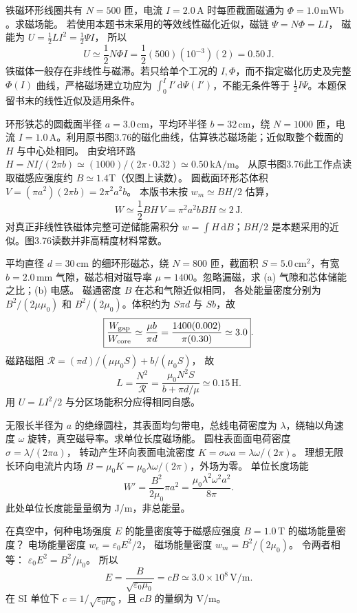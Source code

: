 铁磁环形线圈共有 $N=500$ 匝，电流 $I=2.0\,\mathrm A$ 时每匝截面磁通为 $\Phi=1.0\,\mathrm{mWb}$。求磁场能。
\exsolution
若使用本题书末采用的等效线性磁化近似，磁链 $\Psi=N\Phi=LI$，
磁能为 $U=\frac12 LI^2=\frac12\Psi I$，
所以
\[
\boxed{U\simeq\frac12N\Phi I
=\frac12(500)(10^{-3})(2)=0.50\,\mathrm J}.
\]
\excheck 铁磁体一般存在非线性与磁滞。若只给单个工况的 $I,\Phi$，而不指定磁化历史及完整 $\Phi(I)$ 曲线，严格磁场建立功应为 $\int_0^I I'\,\mathrm d\Psi(I')$，不能无条件等于 $\frac12I\Psi$。本题保留书末的线性近似及适用条件。

环形铁芯的圆截面半径 $a=3.0\,\mathrm{cm}$，平均环半径 $b=32\,\mathrm{cm}$，绕 $N=1000$ 匝，电流 $I=1.0\,\mathrm A$。利用原书图3.76的磁化曲线，估算铁芯磁场能；近似取整个截面的 $H$ 与中心处相同。
\exsolution
由安培环路
$H=NI/(2\pi b)\simeq(1000)/(2\pi\cdot0.32)
\simeq0.50\,\mathrm{kA/m}$。
从原书图3.76此工作点读取磁感应强度约 $B\simeq1.4$T（仅图上读数）。
圆截面环形芯体积
$V=(\pi a^2)(2\pi b)=2\pi^2a^2b$。
本版书末按 $w_m\simeq BH/2$ 估算，
\[
\boxed{W\simeq\frac12BH\,V
=\pi^2a^2bBH\simeq2\,\mathrm J}.
\]
\excheck 对真正非线性铁磁体完整可逆储能需积分 $w=\int H\,\mathrm dB$；$BH/2$ 是本题采用的近似。图3.76读数并非高精度材料常数。

平均直径 $d=30\,\mathrm{cm}$ 的细环形磁芯，绕 $N=800$ 匝，截面积 $S=5.0\,\mathrm{cm^2}$，有宽 $b=2.0\,\mathrm{mm}$ 气隙，磁芯相对磁导率 $\mu=1400$。忽略漏磁，求 (a) 气隙和芯体储能之比；(b) 电感。
\exsolution
磁通密度 $B$ 在芯和气隙近似相同，
各处能量密度分别为 $B^2/(2\mu\mu_0)$ 和 $B^2/(2\mu_0)$。体积约为 $S\pi d$ 与 $Sb$，故
\[
\boxed{\frac{W_{\rm gap}}{W_{\rm core}}
\simeq\frac{\mu b}{\pi d}
=\frac{1400(0.002)}{\pi(0.30)}\simeq3.0}.
\]
磁路磁阻
$\mathcal R=(\pi d)/(\mu\mu_0S)+b/(\mu_0S)$，
故
\[
\boxed{L=\frac{N^2}{\mathcal R}
=\frac{\mu_0N^2S}{b+\pi d/\mu}
\simeq0.15\,\mathrm H}.
\]
\excheck 用 $U=LI^2/2$ 与分区场能积分应得相同自感。

无限长半径为 $a$ 的绝缘圆柱，其表面均匀带电，总线电荷密度为 $\lambda$，绕轴以角速度 $\omega$ 旋转，真空磁导率。求单位长度磁场能。
\exsolution
圆柱表面面电荷密度
$\sigma=\lambda/(2\pi a)$，
转动产生环向表面电流密度
$K=\sigma\omega a=\lambda\omega/(2\pi)$。
理想无限长环向电流片内场
$B=\mu_0K=\mu_0\lambda\omega/(2\pi)$，外场为零。
单位长度场能
\[
W'=\frac{B^2}{2\mu_0}\pi a^2
=\boxed{\frac{\mu_0\lambda^2\omega^2a^2}{8\pi}}.
\]
\excheck 此处单位长度能量量纲为 J/m，非总能量。

在真空中，何种电场强度 $E$ 的能量密度等于磁感应强度 $B=1.0\,\mathrm T$ 的磁场能量密度？
\exsolution
电场能量密度 $w_e=\varepsilon_0E^2/2$，
磁场能量密度 $w_m=B^2/(2\mu_0)$。
令两者相等：
$\varepsilon_0E^2=B^2/\mu_0$。
所以
\[
\boxed{E=\frac B{\sqrt{\varepsilon_0\mu_0}}=cB
\simeq3.0\times10^8\,\mathrm{V/m}}.
\]
\excheck 在 SI 单位下 $c=1/\sqrt{\varepsilon_0\mu_0}$，且 $cB$ 的量纲为 V/m。

